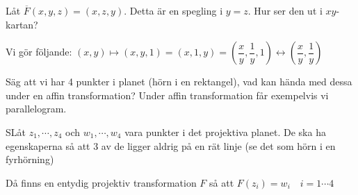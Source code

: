 \noindent Låt $\overline{F}(x,y,z)=(x,z,y)$. Detta är en spegling i $y=z$. Hur ser den ut i $xy$-kartan?\par
\noindent Vi gör följande: $(x,y)\mapsto(x,y,1)=(x,1,y) = \left(\dfrac{x}{y},\dfrac{1}{y},1\right)\leftrightarrow\left(\dfrac{x}{y},\dfrac{1}{y}\right)$
\par\bigskip
\noindent Säg att vi har 4 punkter i planet (hörn i en rektangel), vad kan hända med dessa under en affin transformation? Under affin transformation får exempelvis vi parallelogram.
\par\bigskip
\begin{theo}
  SLåt $z_1,\cdots, z_4$ och $w_1,\cdots, w_4$ vara punkter i det projektiva planet. De ska ha egenskaperna så att 3 av de ligger aldrig på en rät linje (se det som hörn i en fyrhörning)
  \par\bigskip
  \noindent Då finns en entydig projektiv transformation $F$ så att $F(z_i) = w_i\quad i=1\cdots4$
\end{theo}
\par\bigskip
